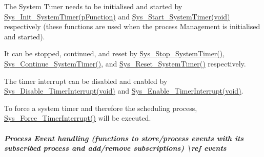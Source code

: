 \begin{DoxyEnumerate}
\item The System Timer needs to be initialised and started by \hyperlink{system__Timer_8h_a43fb10a158f96d4512ffa1fdddfe28ec}{Sys\+\_\+\+Init\+\_\+\+System\+Timer(p\+Function)} and \hyperlink{system__Timer_8h_afc0f400adea75936546abe01771ee9b2}{Sys\+\_\+\+Start\+\_\+\+System\+Timer(void)} respectively (these functions are used when the process Management is initialised and started).
\item It can be stopped, continued, and reset by \hyperlink{system__Timer_8c_a2c6bd2b2521ccaeeae10827c5e626f84}{Sys\+\_\+\+Stop\+\_\+\+System\+Timer()}, \hyperlink{system__Timer_8c_ab2fcca740eab21a9412fc9ec44aa7c69}{Sys\+\_\+\+Continue\+\_\+\+System\+Timer()}, and \hyperlink{system__Timer_8c_adae83d87319518b33a7cdd6e01adc546}{Sys\+\_\+\+Reset\+\_\+\+System\+Timer()} respectively.
\item The timer interrupt can be disabled and enabled by \hyperlink{system__Timer_8h_a038b8f0be088220d0aabc6a13a4769e3}{Sys\+\_\+\+Disable\+\_\+\+Timer\+Interrupt(void)} and \hyperlink{system__Timer_8h_a27a2d4e84310e08b6b8e50c5e7b9cb2b}{Sys\+\_\+\+Enable\+\_\+\+Timer\+Interrupt(void)}.
\item To force a system timer and therefore the scheduling process, \hyperlink{system__Timer_8c_a8ea6aac01f3a93fbbe5b5d03f35b23bd}{Sys\+\_\+\+Force\+\_\+\+Timer\+Interrupt()} will be executed. 
\end{DoxyEnumerate}\hypertarget{group__process_process_event}{}\subparagraph{Process Event handling (functions to store/process events with it\textquotesingle{}s subscribed process and add/remove subscriptions) \textbackslash{}ref events}\label{group__process_process_event}

